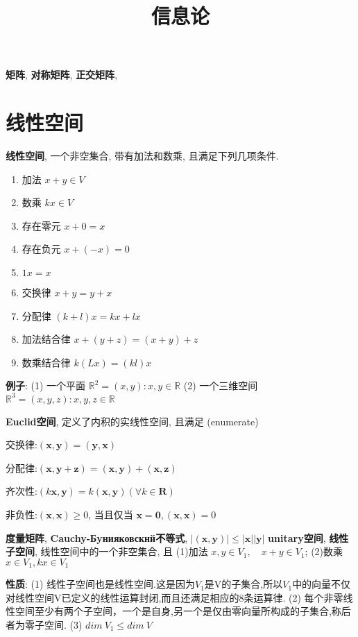 \documentclass{article}
\title{信息论}\date{} \linespread{1.25}
\newcommand{\defi}[2]{\textbf{#1}, #2}
\newcommand{\bb}{\boldsymbol}
\begin{document}
\tableofcontents


\defi{矩阵}
    \defi{对称矩阵}
    \defi{正交矩阵}

\section{线性空间}
    \defi{线性空间}{一个非空集合, 带有加法和数乘, 且满足下列几项条件.}
        \begin{enumerate}
            \item 加法   $x+y \in V$
            \item 数乘   $k x \in V$
            \item 存在零元 $x+0=x$
            \item 存在负元 $x+(-x) = 0$
            \item $1x = x$
            \item 交换律 $x+y = y+x$
            \item 分配律 $(k+l)x = kx+lx$
            \item 加法结合律 $x+(y+z) = (x+y) +z$
            \item 数乘结合律 $k(Lx) = (kl)x$
        \end{enumerate}

    \textbf{例子}:
        (1) 一个平面 $\mathbb R^2 = {(x,y): x, y\in \mathbb R}$
        (2) 一个三维空间 $\mathbb R^3 = {(x,y,z): x, y, z\in \mathbb R}$

        \defi{Euclid空间}{定义了内积的实线性空间, 且满足 \evn(enumerate){
            \item 交换律:$(\bb x , \bb y )=(\bb y , \bb x )$
            \item 分配律:$(\bb x , \bb y +\bb z )=(\bb x , \bb y )+(\bb x , \bb z )$
            \item 齐次性:$(k \bb x , \bb y )=k(\bb x , \bb y )(\forall k \in \bb R )$
            \item 非负性:$(\bb x , \bb x ) \ge 0$, 当且仅当 $\bb x =\bb 0 ,(\bb x , \bb x )=0$
        }}
            \defi{度量矩阵}
            \defi{Cauchy-Бyнияковскнй不等式}{$|(\boldsymbol{x}, \boldsymbol{y})| \leqslant|\boldsymbol{x}||\boldsymbol{y}|$}
        \defi{unitary空间}


    \defi{线性子空间}{线性空间中的一个非空集合, 且 (1)加法 $x,y\in V_1 ,\quad x+y \in V_1$; (2)数乘 $x \in V_1, k x \in V_1$}

        \textbf{性质}: 
            (1) 线性子空间也是线性空间.这是因为$V_1$是V的子集合,所以$V_1$中的向量不仅对线性空间V已定义的线性运算封闭,而且还满足相应的8条运算律.
            (2) 每个非零线性空间至少有两个子空间，一个是自身,另一个是仅由零向量所构成的子集合,称后者为零子空间.             
            (3) $dim\ V_1 \le dim\ V$
\end{document}
